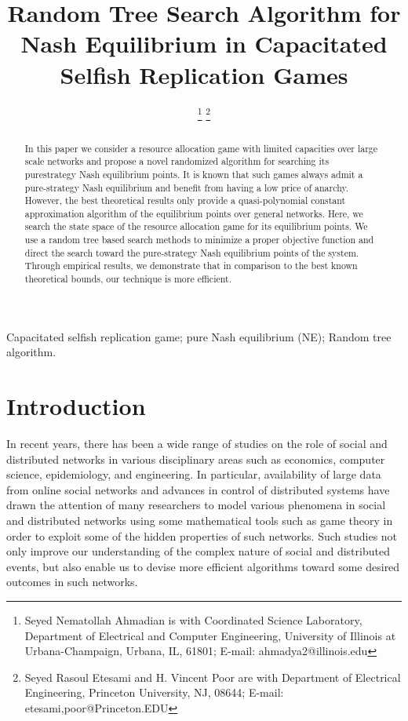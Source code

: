 \documentclass[conference, 10pt, twocolumn]{ieeeconf}
\begin{document}
\title{Random Tree Search Algorithm for Nash Equilibrium in Capacitated Selfish
Replication Games}
\author{
  \authorblockA{}
\thanks{\textdagger Seyed Nematollah Ahmadian is with
Coordinated Science Laboratory,
Department of Electrical and Computer Engineering,
University of Illinois at Urbana-Champaign, Urbana, IL, 61801;
E-mail: {ahmadya2}@illinois.edu}
\thanks{
\textdaggerdbl Seyed Rasoul Etesami and H. Vincent Poor are with
Department of Electrical Engineering,
Princeton University, NJ, 08644;
E-mail: etesami,poor@Princeton.EDU}
}
\maketitle
\begin{abstract}
In this paper we consider a resource allocation
game with limited capacities over large scale networks and
propose a novel randomized algorithm for searching its purestrategy
Nash equilibrium points. It is known that such games
always admit a pure-strategy Nash equilibrium and benefit
from having a low price of anarchy. However, the best
theoretical results only provide a quasi-polynomial constant
approximation algorithm of the equilibrium points over general
networks. Here, we search the state space of the resource
allocation game for its equilibrium points. We use a random
tree based search methods to minimize a proper objective
function and direct the search toward the pure-strategy Nash
equilibrium points of the system. Through empirical results, we
demonstrate that in comparison to the best known theoretical
bounds, our technique is more efficient.
\end{abstract}
\begin{keywords}
Capacitated selfish replication game; pure Nash equilibrium (NE); Random tree algorithm.
\end{keywords}

\section{Introduction}
In recent years, there has been a wide range of studies on the role of social and distributed networks in various disciplinary areas such as economics, computer science, epidemiology, and engineering. In particular, availability of large data from online social networks and advances in control of distributed systems have drawn the attention of many researchers to model various phenomena in social and distributed networks using some mathematical tools such as game theory in order to exploit some of the hidden properties of such networks. Such studies not only improve our understanding of the complex nature of social and distributed events, but also enable us to devise more efficient algorithms toward some desired outcomes in such networks. 
\end{document}
